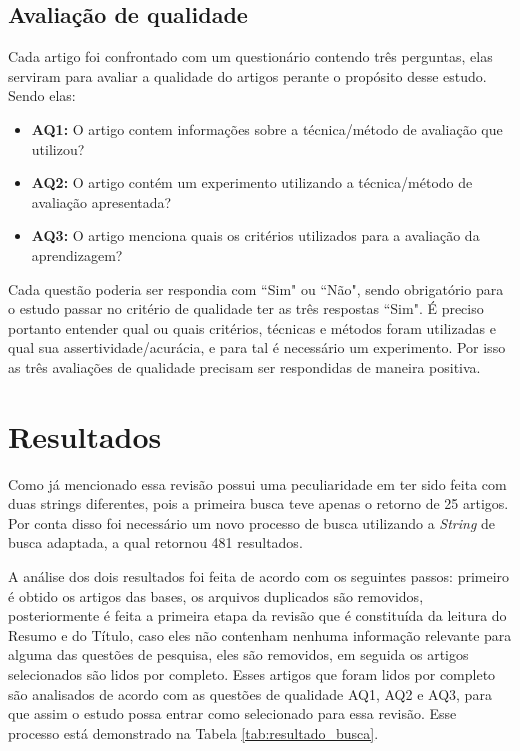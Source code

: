 \documentclass[12pt]{article}
\begin{document}
\subsection{Avaliação de qualidade}

Cada artigo foi confrontado com um questionário contendo três perguntas, elas serviram para avaliar a qualidade do artigos perante o propósito desse estudo. Sendo elas:

\begin{itemize}
    \item \textbf{AQ1:} O artigo contem informações sobre a técnica/método de avaliação que utilizou?
    \item \textbf{AQ2:} O artigo contém um experimento utilizando a técnica/método de avaliação apresentada?
    \item \textbf{AQ3:} O artigo menciona quais os critérios utilizados para a avaliação da aprendizagem?
\end{itemize}

Cada questão poderia ser respondia com ``Sim" ou ``Não", sendo obrigatório para o estudo passar no critério de qualidade ter as três respostas ``Sim". É preciso portanto entender qual ou quais critérios, técnicas e métodos foram utilizadas e qual sua assertividade/acurácia, e para tal é necessário um experimento. Por isso as três avaliações de qualidade precisam ser respondidas de maneira positiva.

\section{Resultados}\label{sec:resultados}

Como já mencionado essa revisão possui uma peculiaridade em ter sido feita com duas strings diferentes, pois a primeira busca teve apenas o retorno de 25 artigos. Por conta disso foi necessário um novo processo de busca utilizando a \textit{String} de busca adaptada, a qual retornou 481 resultados.

A análise dos dois resultados foi feita de acordo com os seguintes passos: primeiro é obtido os artigos das bases, os arquivos duplicados são removidos, posteriormente é feita a primeira etapa da revisão que é constituída da leitura do Resumo e do Título, caso eles não contenham nenhuma informação relevante para alguma das questões de pesquisa, eles são removidos, em seguida os artigos selecionados são lidos por completo. Esses artigos que foram lidos por completo são analisados de acordo com as questões de qualidade AQ1, AQ2 e AQ3, para que assim o estudo possa entrar como selecionado para essa revisão. Esse processo está demonstrado na Tabela \ref{tab:resultado_busca}.
\end{document}
